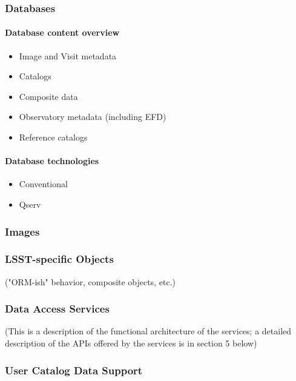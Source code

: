 \documentclass[DM,lsstdraft,toc]{lsstdoc}
\begin{document}
\subsubsection{Databases}\label{databases}

\paragraph{Database content overview}\label{database-content-overview}

\begin{itemize}
\item Image and Visit metadata
\item Catalogs
\item Composite data
\item Observatory metadata (including EFD)
\item Reference catalogs
\end{itemize}

\paragraph{Database technologies}\label{database-technologies}

\begin{itemize}
\item Conventional
\item Qserv
\end{itemize}

\subsubsection{Images}\label{images}

\subsubsection{LSST-specific Objects}\label{lsst-specific-objects}

("ORM-ish" behavior, composite objects, etc.)

\subsubsection{Data Access Services}\label{data-access-services}

(This is a description of the functional architecture of the services; a detailed description of the APIs offered by the services is in section 5 below)

\subsubsection{User Catalog Data Support}\label{user-catalog-data-support}
\end{document}
